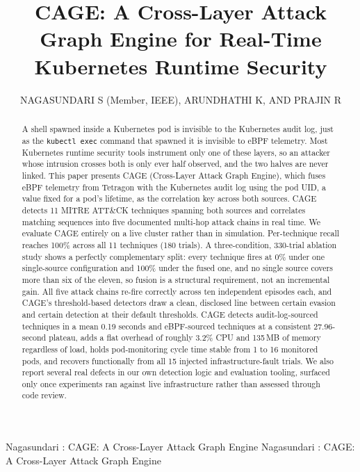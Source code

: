 \documentclass{ieeeaccess}
\begin{document}

\title{CAGE: A Cross-Layer Attack Graph Engine for Real-Time Kubernetes Runtime Security}

\author{\uppercase{Nagasundari S} (Member, IEEE), \uppercase{Arundhathi K}, AND \uppercase{Prajin R}}
\address[1]{Department of CSE, Center for Information Security, Forensics and Cyber Resilience, PES University, Bengaluru 560085, India}

\markboth
{Nagasundari \headeretal: CAGE: A Cross-Layer Attack Graph Engine}
{Nagasundari \headeretal: CAGE: A Cross-Layer Attack Graph Engine}


\begin{abstract}
A shell spawned inside a Kubernetes pod is invisible to the Kubernetes
audit log, just as the \texttt{kubectl exec} command that spawned it is
invisible to eBPF telemetry. Most Kubernetes runtime security tools
instrument only one of these layers, so an attacker whose intrusion
crosses both is only ever half observed, and the two halves are never
linked. This paper presents CAGE (Cross-Layer Attack Graph Engine),
which fuses eBPF telemetry from Tetragon with the Kubernetes audit log
using the pod UID, a value fixed for a pod's lifetime, as the
correlation key across both sources. CAGE detects 11 MITRE ATT\&CK
techniques spanning both sources and correlates matching sequences into
five documented multi-hop attack chains in real time. We evaluate CAGE
entirely on a live cluster rather than in simulation. Per-technique
recall reaches 100\% across all 11 techniques (180 trials). A
three-condition, 330-trial ablation study shows a perfectly
complementary split: every technique fires at 0\% under one
single-source configuration and 100\% under the fused one, and no
single source covers more than six of the eleven, so fusion is a
structural requirement, not an incremental gain. All five attack chains
re-fire correctly across ten independent episodes each, and CAGE's
threshold-based detectors draw a clean, disclosed line between certain
evasion and certain detection at their default thresholds. CAGE detects
audit-log-sourced techniques in a mean 0.19 seconds and eBPF-sourced
techniques at a consistent 27.96-second plateau, adds a flat overhead
of roughly 3.2\% CPU and 135\,MB of memory regardless of load, holds
pod-monitoring cycle time stable from 1 to 16 monitored pods, and
recovers functionally from all 15 injected infrastructure-fault trials.
We also report several real defects in our own detection logic and
evaluation tooling, surfaced only once experiments ran against live
infrastructure rather than assessed through code review.
\end{abstract}
\end{document}
